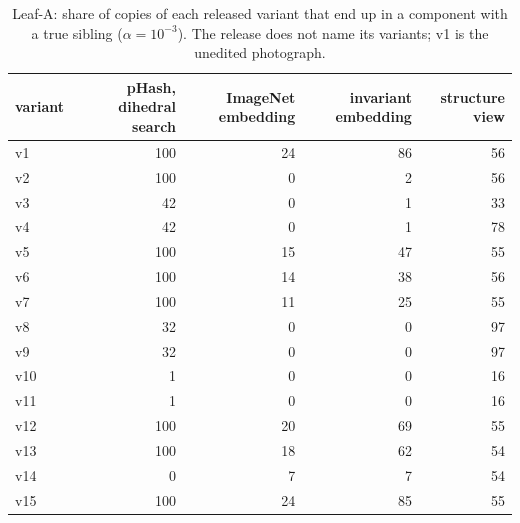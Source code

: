 \begin{table}[h]
\centering\footnotesize
\setlength{\tabcolsep}{4pt}
\caption{Leaf-A: share of copies of each released variant that end up in a component with a true sibling ($\alpha=10^{-3}$). The release does not name its variants; v1 is the unedited photograph.}
\label{tab:variants}
\begin{tabular}{@{}lrrrr@{}}
\toprule
variant & pHash, dihedral search & ImageNet embedding & invariant embedding & structure view \\
\midrule
v1 & 100 & 24 & 86 & 56 \\
v2 & 100 & 0 & 2 & 56 \\
v3 & 42 & 0 & 1 & 33 \\
v4 & 42 & 0 & 1 & 78 \\
v5 & 100 & 15 & 47 & 55 \\
v6 & 100 & 14 & 38 & 56 \\
v7 & 100 & 11 & 25 & 55 \\
v8 & 32 & 0 & 0 & 97 \\
v9 & 32 & 0 & 0 & 97 \\
v10 & 1 & 0 & 0 & 16 \\
v11 & 1 & 0 & 0 & 16 \\
v12 & 100 & 20 & 69 & 55 \\
v13 & 100 & 18 & 62 & 54 \\
v14 & 0 & 7 & 7 & 54 \\
v15 & 100 & 24 & 85 & 55 \\
\bottomrule
\end{tabular}
\end{table}
